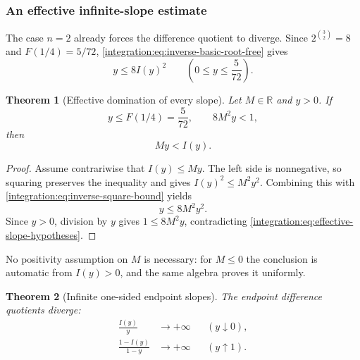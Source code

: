 \documentclass[11pt,oneside]{article}
\newtheorem{theorem}{Theorem}[section]
\theoremstyle{definition}
\theoremstyle{remark}
\newcommand{\R}{\mathbb R}
\begin{document}
\subsubsection{An effective infinite-slope estimate}

The case $n=2$ already forces the difference quotient to diverge.  Since
$2^{\binom32}=8$ and $F(1/4)=5/72$, \eqref{integration:eq:inverse-basic-root-free} gives
\begin{equation}
 y\le8I(y)^2
 \qquad\left(0\le y\le\frac5{72}\right).
 \label{integration:eq:inverse-square-bound}
\end{equation}

\begin{theorem}[Effective domination of every slope]
\label{integration:thm:inverse-effective-slope}
Let $M\in\R$ and $y>0$.  If
\begin{equation}
 y\le F(1/4)=\frac5{72},
 \qquad
 8M^2y<1,
 \label{integration:eq:effective-slope-hypotheses}
\end{equation}
then
\begin{equation}
 My<I(y).
 \label{integration:eq:effective-slope-conclusion}
\end{equation}
\end{theorem}

\begin{proof}
Assume contrariwise that $I(y)\le My$.  The left side is nonnegative, so squaring preserves
the inequality and gives $I(y)^2\le M^2y^2$.  Combining this with
\eqref{integration:eq:inverse-square-bound} yields
\[
 y\le8M^2y^2.
\]
Since $y>0$, division by $y$ gives $1\le8M^2y$, contradicting
\eqref{integration:eq:effective-slope-hypotheses}.
\end{proof}

No positivity assumption on $M$ is necessary: for $M\le0$ the conclusion is automatic from
$I(y)>0$, and the same algebra proves it uniformly.

\begin{theorem}[Infinite one-sided endpoint slopes]
\label{integration:thm:inverse-infinite-slope}
The endpoint difference quotients diverge:
\begin{align}
 \frac{I(y)}{y}&\longrightarrow+\infty
   &&(y\downarrow0),                                       \label{integration:eq:inverse-slope-zero}\\
 \frac{1-I(y)}{1-y}&\longrightarrow+\infty
   &&(y\uparrow1).                                         \label{integration:eq:inverse-slope-one}
\end{align}
\end{theorem}
\end{document}
